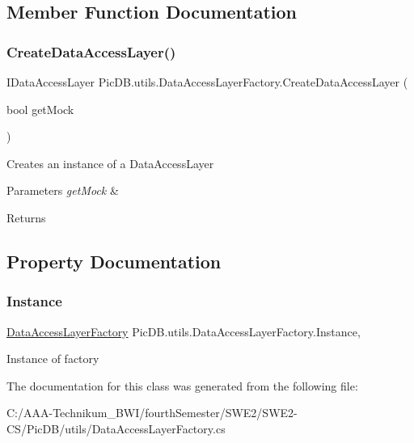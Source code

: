\subsection{Member Function Documentation}
\mbox{\label{class_pic_d_b_1_1utils_1_1_data_access_layer_factory_af77c8ea83e31805254322562ac7909d0}} 
\subsubsection{\texorpdfstring{Create\+Data\+Access\+Layer()}{CreateDataAccessLayer()}}
{\footnotesize\ttfamily I\+Data\+Access\+Layer Pic\+D\+B.\+utils.\+Data\+Access\+Layer\+Factory.\+Create\+Data\+Access\+Layer (\begin{DoxyParamCaption}\item[{bool}]{get\+Mock }\end{DoxyParamCaption})}



Creates an instance of a Data\+Access\+Layer 


\begin{DoxyParams}{Parameters}
{\em get\+Mock} & \\
\hline
\end{DoxyParams}
\begin{DoxyReturn}{Returns}

\end{DoxyReturn}


\subsection{Property Documentation}
\mbox{\label{class_pic_d_b_1_1utils_1_1_data_access_layer_factory_afc4b41420ecc9b3f36a02937e358592c}} 
\subsubsection{\texorpdfstring{Instance}{Instance}}
{\footnotesize\ttfamily \mbox{\hyperlink{class_pic_d_b_1_1utils_1_1_data_access_layer_factory}{Data\+Access\+Layer\+Factory}} Pic\+D\+B.\+utils.\+Data\+Access\+Layer\+Factory.\+Instance\hspace{0.3cm}{\ttfamily [static]}, {\ttfamily [get]}}



Instance of factory 



The documentation for this class was generated from the following file\+:\begin{DoxyCompactItemize}
\item 
C\+:/\+A\+A\+A-\/\+Technikum\+\_\+\+B\+W\+I/fourth\+Semester/\+S\+W\+E2/\+S\+W\+E2-\/\+C\+S/\+Pic\+D\+B/utils/Data\+Access\+Layer\+Factory.\+cs\end{DoxyCompactItemize}
